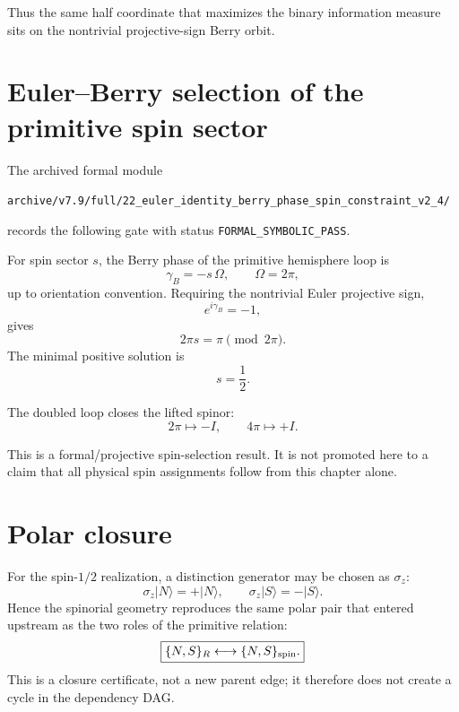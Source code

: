 Thus the same half coordinate that maximizes the binary information measure sits on the nontrivial projective-sign Berry orbit.

\section{Euler--Berry selection of the primitive spin sector}

The archived formal module
\begin{center}
\texttt{archive/v7.9/full/22\_euler\_identity\_berry\_phase\_spin\_constraint\_v2\_4/}
\end{center}
records the following gate with status \texttt{FORMAL\_SYMBOLIC\_PASS}.

For spin sector $s$, the Berry phase of the primitive hemisphere loop is
\begin{equation}
\gamma_B=-s\,\Omega,
\qquad
\Omega=2\pi,
\end{equation}
up to orientation convention. Requiring the nontrivial Euler projective sign,
\begin{equation}
e^{i\gamma_B}=-1,
\end{equation}
gives
\begin{equation}
2\pi s=\pi\pmod{2\pi}.
\end{equation}
The minimal positive solution is
\begin{equation}
\boxed{s=\frac12.}
\label{eq:v12_spin_half_selection}
\end{equation}

The doubled loop closes the lifted spinor:
\begin{equation}
\boxed{
2\pi\mapsto-I,
\qquad
4\pi\mapsto+I.
}
\label{eq:v12_spin_double_cover}
\end{equation}

This is a formal/projective spin-selection result. It is not promoted here to a claim that all physical spin assignments follow from this chapter alone.

\section{Polar closure}

For the spin-$1/2$ realization, a distinction generator may be chosen as $\sigma_z$:
\begin{equation}
\sigma_z|N\rangle=+|N\rangle,
\qquad
\sigma_z|S\rangle=-|S\rangle.
\end{equation}
Hence the spinorial geometry reproduces the same polar pair that entered upstream as the two roles of the primitive relation:
\begin{equation}
\boxed{
\{N,S\}_{R}
\longleftrightarrow
\{N,S\}_{\rm spin}.
}
\label{eq:v12_polar_closure}
\end{equation}
This is a closure certificate, not a new parent edge; it therefore does not create a cycle in the dependency DAG.

